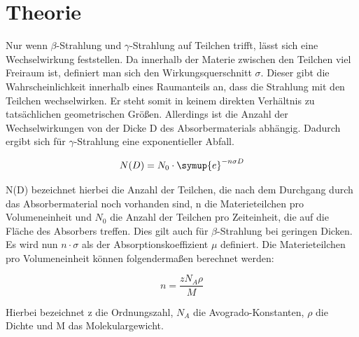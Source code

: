 \section{Theorie}
\label{sec:Theorie}

Nur wenn $\beta$-Strahlung und $\gamma$-Strahlung auf Teilchen trifft, lässt sich eine Wechselwirkung feststellen.
Da innerhalb der Materie zwischen den Teilchen viel Freiraum ist, definiert man sich den Wirkungsquerschnitt $\sigma$.
Dieser gibt die Wahrscheinlichkeit innerhalb eines Raumanteils an, dass die Strahlung mit den Teilchen wechselwirken.
Er steht somit in keinem direkten Verhältnis zu tatsächlichen geometrischen Größen.
Allerdings ist die Anzahl der Wechselwirkungen von der Dicke D des Absorbermaterials abhängig.
Dadurch ergibt sich für $\gamma$-Strahlung eine exponentieller Abfall.

\begin{equation}
  N(D) = N_0 \cdot \symup{e}^{-n \sigma D}
  \label{eqn:expo}
\end{equation}

N(D) bezeichnet hierbei die Anzahl der Teilchen, die nach dem Durchgang durch das Absorbermaterial noch vorhanden sind, n die Materieteilchen pro Volumeneinheit und $N_0$ die Anzahl der Teilchen pro Zeiteinheit, die auf die Fläche des Absorbers treffen.
Dies gilt auch für $\beta$-Strahlung bei geringen Dicken.
Es wird nun $n \cdot \sigma$ als der Absorptionskoeffizient $\mu$ definiert.
Die Materieteilchen pro Volumeneinheit können folgendermaßen berechnet werden:

\begin{equation}
  n = \frac{z N_A \rho}{M}
\end{equation}

Hierbei bezeichnet z die Ordnungszahl, $N_A$ die Avogrado-Konstanten, $\rho$ die Dichte und M das Molekulargewicht.

